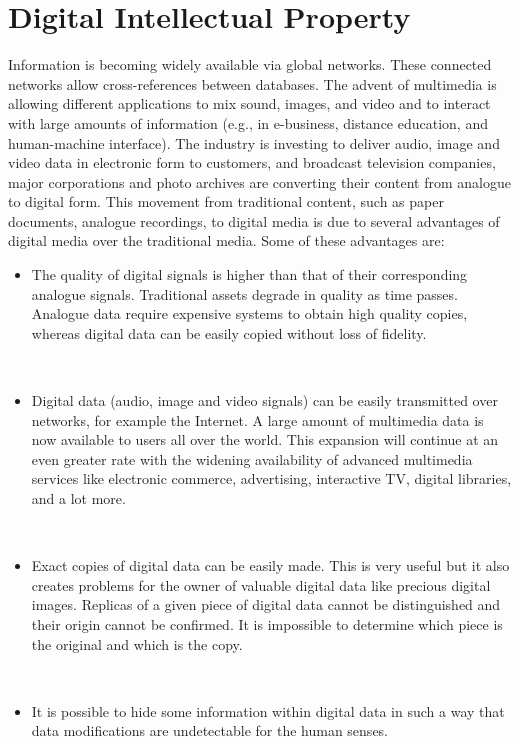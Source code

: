\documentclass[12pt]{IEEEtran}
\begin{document}
\section{Digital Intellectual Property}
Information is becoming widely available via global networks. These connected networks allow cross-references between databases. The advent of multimedia is allowing different applications to mix sound, images, and video and to interact with large amounts of information (e.g., in e-business, distance education, and human-machine interface). The industry is investing to deliver audio, image and video data in electronic form to customers, and broadcast television companies, major corporations and photo archives are converting their content from analogue to digital form. This movement from traditional content, such as paper documents, analogue recordings, to digital media is due to several advantages of digital media over the traditional media. Some of these advantages are:
\begin{itemize}
\item The quality of digital signals is higher than that of their corresponding analogue signals. Traditional assets degrade in quality as time passes. Analogue data require expensive systems to obtain high quality copies, whereas digital data can be easily copied without loss of fidelity.
\end{itemize}\\
\begin{itemize}
\item Digital data (audio, image and video signals) can be easily transmitted over networks, for example the Internet. A large amount of multimedia data is now available to users all over the world. This expansion will continue at an even greater rate with the widening availability of advanced multimedia services like electronic commerce, advertising, interactive TV, digital libraries, and a lot more.
\end{itemize}\\

\begin{itemize}
\item Exact copies of digital data can be easily made. This is very useful but it also creates problems for the owner of valuable digital data like precious digital images. Replicas of a given piece of digital data cannot be distinguished and their origin cannot be confirmed. It is impossible to determine which piece is the original and which is the copy.
\end{itemize}\\
\begin{itemize}
\item It is possible to hide some information within digital data in such a way that data modifications are undetectable for the human senses.
\end{itemize}\\
\end{document}
